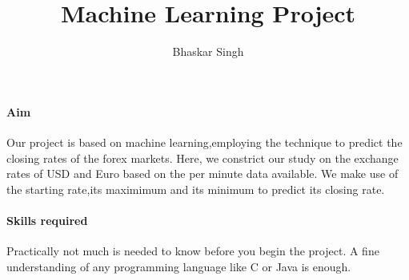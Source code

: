 \documentclass{article}
\title{Machine Learning Project}
\author{Bhaskar Singh}
\begin{document}
 
\begin{titlepage}
\maketitle
\end{titlepage}

\paragraph{Aim}
Our project is based on machine learning,employing the technique to predict the closing rates of the forex markets. Here, we constrict our study on the exchange rates of USD and Euro based on the per minute data available. We make use of the starting rate,its maximimum and its minimum to predict its closing rate.

\paragraph{Skills required}
Practically not much is needed to know before you begin the project. A fine understanding of any programming language like C or Java is enough.
\end{document}
